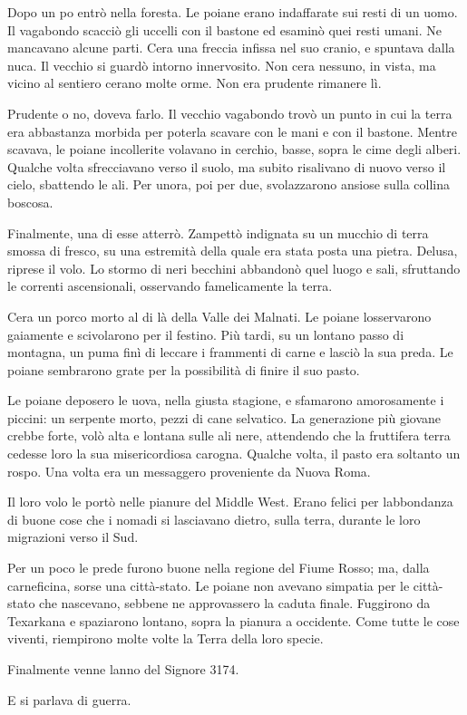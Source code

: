 Dopo un po\textquotesingle{} entrò nella foresta. Le poiane erano
indaffarate sui resti di un uomo. Il vagabondo scacciò gli uccelli con
il bastone ed esaminò quei resti umani. Ne mancavano alcune parti.
C\textquotesingle era una freccia infissa nel suo cranio, e spuntava
dalla nuca. Il vecchio si guardò intorno innervosito. Non
c\textquotesingle era nessuno, in vista, ma vicino al sentiero
c\textquotesingle erano molte orme. Non era prudente rimanere lì.

Prudente o no, doveva farlo. Il vecchio vagabondo trovò un punto in cui
la terra era abbastanza morbida per poterla scavare con le mani e con il
bastone. Mentre scavava, le poiane incollerite volavano in cerchio,
basse, sopra le cime degli alberi. Qualche volta sfrecciavano verso il
suolo, ma subito risalivano di nuovo verso il cielo, sbattendo le ali.
Per un\textquotesingle ora, poi per due, svolazzarono ansiose sulla
collina boscosa.

Finalmente, una di esse atterrò. Zampettò indignata su un mucchio di
terra smossa di fresco, su una estremità della quale era stata posta una
pietra. Delusa, riprese il volo. Lo stormo di neri becchini abbandonò
quel luogo e sali, sfruttando le correnti ascensionali, osservando
famelicamente la terra.

C\textquotesingle era un porco morto al di là della Valle dei Malnati.
Le poiane l\textquotesingle osservarono gaiamente e scivolarono per il
festino. Più tardi, su un lontano passo di montagna, un puma finì di
leccare i frammenti di carne e lasciò la sua preda. Le poiane sembrarono
grate per la possibilità di finire il suo pasto.

Le poiane deposero le uova, nella giusta stagione, e sfamarono
amorosamente i piccini: un serpente morto, pezzi di cane selvatico. La
generazione più giovane crebbe forte, volò alta e lontana sulle ali
nere, attendendo che la fruttifera terra cedesse loro la sua
misericordiosa carogna. Qualche volta, il pasto era soltanto un rospo.
Una volta era un messaggero proveniente da Nuova Roma.

Il loro volo le portò nelle pianure del Middle West. Erano felici per
l\textquotesingle abbondanza di buone cose che i nomadi si lasciavano
dietro, sulla terra, durante le loro migrazioni verso il Sud.

Per un poco le prede furono buone nella regione del Fiume Rosso; ma,
dalla carneficina, sorse una città-stato. Le poiane non avevano simpatia
per le città-stato che nascevano, sebbene ne approvassero la caduta
finale. Fuggirono da Texarkana e spaziarono lontano, sopra la pianura a
occidente. Come tutte le cose viventi, riempirono molte volte la Terra
della loro specie.

Finalmente venne l\textquotesingle anno del Signore 3174.

E si parlava di guerra.
